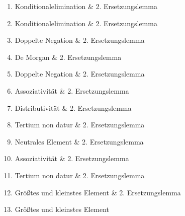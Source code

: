 \documentclass[12pt,a4paper]{scrartcl}
\begin{document}
\begin{enumerate} 
  \item Konditionalelimination \& 2. Ersetzungslemma
  \item Konditionalelimination \& 2. Ersetzungslemma
  \item Doppelte Negation \& 2. Ersetzungslemma
  \item De Morgan \& 2. Ersetzungslemma
  \item Doppelte Negation \& 2. Ersetzungslemma
  \item Assoziativität \& 2. Ersetzungslemma
  \item Distributivität \& 2. Ersetzungslemma
  \item Tertium non datur \& 2. Ersetzungslemma
  \item Neutrales Element \& 2. Ersetzungslemma
  \item Assoziativität \& 2. Ersetzungslemma
  \item Tertium non datur \& 2. Ersetzungslemma
  \item Größtes und kleinstes Element \& 2. Ersetzungslemma
  \item Größtes und kleinstes Element
\end{enumerate}
\end{document}
